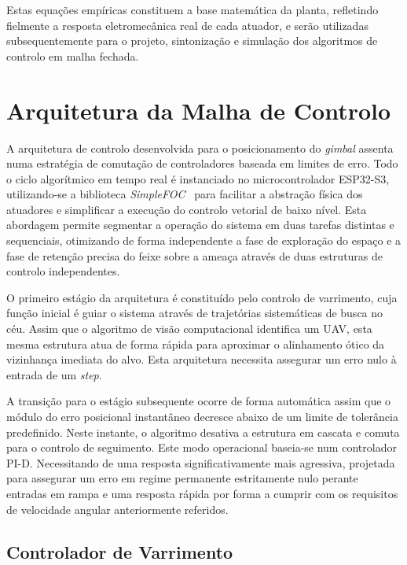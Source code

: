 Estas equações empíricas constituem a base matemática da planta, refletindo fielmente a resposta eletromecânica real de cada atuador, e serão utilizadas subsequentemente para o projeto, sintonização e simulação dos algoritmos de controlo em malha fechada.



\section{Arquitetura da Malha de Controlo}
\label{sec:malha_controlo}

A arquitetura de controlo desenvolvida para o posicionamento do \emph{gimbal} assenta numa estratégia de comutação de controladores baseada em limites de erro. Todo o ciclo algorítmico em tempo real é instanciado no microcontrolador ESP32-S3, utilizando-se a biblioteca \emph{SimpleFOC}~\cite{simplefoc} para facilitar a abstração física dos atuadores e simplificar a execução do controlo vetorial de baixo nível. Esta abordagem permite segmentar a operação do sistema em duas tarefas distintas e sequenciais, otimizando de forma independente a fase de exploração do espaço e a fase de retenção precisa do feixe sobre a ameaça através de duas estruturas de controlo independentes.

O primeiro estágio da arquitetura é constituído pelo controlo de varrimento, cuja função inicial é guiar o sistema através de trajetórias sistemáticas de busca no céu. Assim que o algoritmo de visão computacional identifica um \ac{UAV}, esta mesma estrutura atua de forma rápida para aproximar o alinhamento ótico da vizinhança imediata do alvo. Esta arquitetura necessita assegurar um erro nulo à entrada de um \emph{step}.

A transição para o estágio subsequente ocorre de forma automática assim que o módulo do erro posicional instantâneo decresce abaixo de um limite de tolerância predefinido. Neste instante, o algoritmo desativa a estrutura em cascata e comuta para o controlo de seguimento. Este modo operacional baseia-se num controlador PI-D. Necessitando de uma resposta significativamente mais agressiva, projetada para assegurar um erro em regime permanente estritamente nulo perante entradas em rampa e uma resposta rápida por forma a cumprir com os requisitos de velocidade angular anteriormente referidos.

\subsection{Controlador de Varrimento}
\label{subsec:controlador_varrimento}


